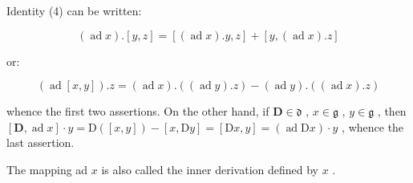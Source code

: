 Identity (4) can be written:

\[
(\operatorname{ad} x). [ y, z ] = [ (\operatorname{ad} x). y, z ] + [ y, (\operatorname{ad} x). z ]
\]

or:

\[
(\operatorname{ad} [ x, y ]). z = (\operatorname{ad} x). ((\operatorname{ad} y). z) - (\operatorname{ad} y). ((\operatorname{ad} x). z)
\]

whence the first two assertions. On the other hand, if \(\mathbf{D} \in \mathfrak{d}\) , \(x \in \mathfrak{g}\) , \(y \in \mathfrak{g}\) , then \([\mathbf{D}, \operatorname{ad} x] \cdot y = \mathrm{D}([x, y]) - [x, \mathrm{D}y] = [\mathrm{D}x, y] = (\operatorname{ad} \mathrm{D}x) \cdot y\) , whence the last assertion.

The mapping ad \(x\) is also called the inner derivation defined by \(x\) .

